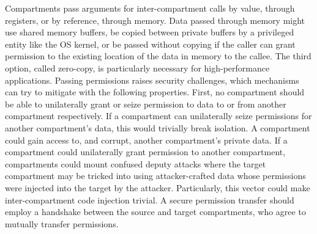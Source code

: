 Compartments pass arguments for inter-compartment calls by value, through 
registers, or by reference, through memory.
Data passed through memory might use shared memory buffers, be copied between
private buffers by a privileged entity like the OS kernel, or be passed without
copying if the caller can grant permission to the existing location of the data
in memory to the callee.
The third option, called zero-copy, is particularly necessary for high-performance
applications.
Passing permissions raises security challenges, which mechanisms can try to 
mitigate with the following properties. 
First, no compartment should be able to unilaterally grant or seize permission to 
data to or from another compartment respectively.
If a compartment can unilaterally seize permissions for another compartment's data,
this would trivially break isolation.
A compartment could gain access to, and corrupt, another compartment's private
data.
If a compartment could unilaterally grant permission to another compartment, 
compartments could mount confused deputy attacks where the target compartment may
be tricked into using attacker-crafted data whose permissions were injected into
the target by the attacker.
Particularly, this vector could make inter-compartment code injection trivial.
A secure permission transfer should employ a handshake between the source and
target compartments, who agree to mutually transfer permissions.

